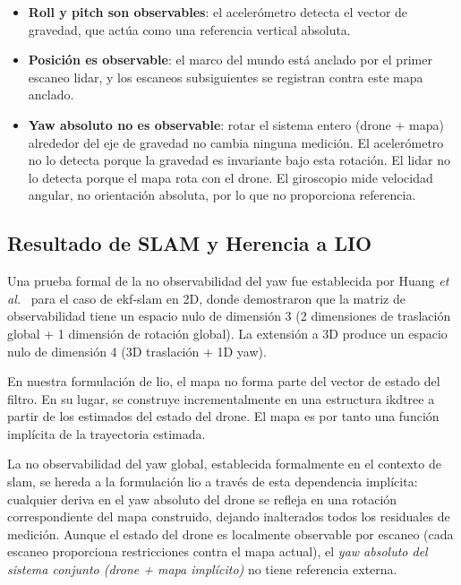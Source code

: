 \begin{itemize}
    \item \textbf{Roll y pitch son observables}: el acelerómetro detecta el
    vector de gravedad, que actúa como una referencia vertical absoluta.
    \item \textbf{Posición es observable}: el marco del mundo está anclado por
    el primer escaneo \gls{lidar}, y los escaneos subsiguientes se registran
    contra este mapa anclado.
    \item \textbf{Yaw absoluto no es observable}: rotar el sistema entero
    (drone + mapa) alrededor del eje de gravedad no cambia ninguna medición.
    El acelerómetro no lo detecta porque la gravedad es invariante bajo esta
    rotación. El \gls{lidar} no lo detecta porque el mapa rota con el drone.
    El giroscopio mide velocidad angular, no orientación absoluta, por lo que
    no proporciona referencia.
\end{itemize}

\subsection{Resultado de SLAM y Herencia a LIO}
\label{sec:fej-herencia-slam}

Una prueba formal de la no observabilidad del yaw fue establecida por Huang
\emph{et al.}~\cite{huang2010observability} para el caso de \gls{ekf}-\gls{slam}
en 2D, donde demostraron que la matriz de observabilidad tiene un espacio nulo
de dimensión 3 (2 dimensiones de traslación global + 1 dimensión de rotación
global). La extensión a 3D produce un espacio nulo de dimensión 4 (3D
traslación + 1D yaw).

En nuestra formulación de \gls{lio}, el mapa no forma parte del vector de
estado del filtro. En su lugar, se construye incrementalmente en una estructura
\gls{ikdtree} a partir de los estimados del estado del drone. El mapa es por
tanto una función implícita de la trayectoria estimada.

La no observabilidad del yaw global, establecida formalmente en el contexto de
\gls{slam}, se hereda a la formulación \gls{lio} a través de esta dependencia
implícita: cualquier deriva en el yaw absoluto del drone se refleja en una
rotación correspondiente del mapa construido, dejando inalterados todos los
residuales de medición. Aunque el estado del drone es localmente observable
por escaneo (cada escaneo proporciona restricciones contra el mapa actual), el
\emph{yaw absoluto del sistema conjunto (drone + mapa implícito)} no tiene
referencia externa.

